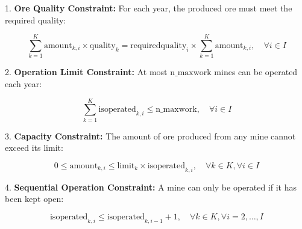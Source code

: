 \documentclass{article}
\begin{document}
1. \textbf{Ore Quality Constraint:} For each year, the produced ore must meet the required quality:

\[
\sum_{k=1}^{K} \text{amount}_{k,i} \times \text{quality}_k = \text{requiredquality}_i \times \sum_{k=1}^{K} \text{amount}_{k,i}, \quad \forall i \in I
\]

2. \textbf{Operation Limit Constraint:} At most \(\text{n\_maxwork}\) mines can be operated each year:

\[
\sum_{k=1}^{K} \text{isoperated}_{k,i} \leq \text{n\_maxwork}, \quad \forall i \in I
\]

3. \textbf{Capacity Constraint:} The amount of ore produced from any mine cannot exceed its limit:

\[
0 \leq \text{amount}_{k,i} \leq \text{limit}_k \times \text{isoperated}_{k,i}, \quad \forall k \in K, \forall i \in I
\]

4. \textbf{Sequential Operation Constraint:} A mine can only be operated if it has been kept open:

\[
\text{isoperated}_{k,i} \leq \text{isoperated}_{k,i-1} + 1, \quad \forall k \in K, \forall i = 2, \ldots, I 
\]
\end{document}
